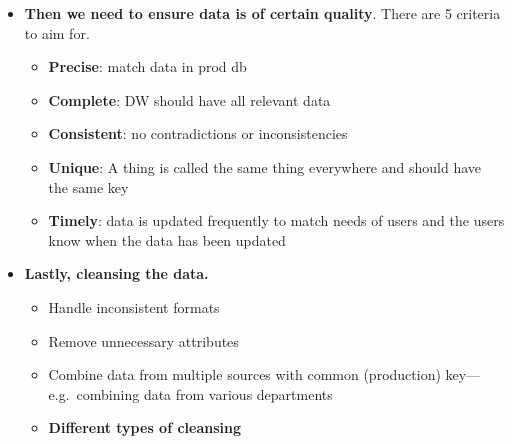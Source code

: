 \begin{multicols}{2}
\begin{itemize}
\begin{itemize}
\begin{itemize}
      \begin{itemize}
            \item
        E.g. date/time format conversions, so it is uniform.
      \end{itemize}
    \item
      \textbf{Normalization/denormalization}

      \begin{itemize}
            \item
        To desired format: star schema, snowflake schema, etc
      \end{itemize}
    \item
      \textbf{Building keys}

      \begin{itemize}
            \item
        Table matches production keys to surrogate DW keys

        \begin{itemize}
                \item
          Ensure production keys map to surrogate keys in DW
        \end{itemize}
      \item
        Correct handling of history (e.g.~with type 2 dimensions,
        especially for total reload)
      \end{itemize}
    \end{itemize}
  \item
    \textbf{Then we need to ensure data is of certain quality}. There
    are 5 criteria to aim for.

    \begin{itemize}
        \item
      \textbf{Precise}: match data in prod db
    \item
      \textbf{Complete}: DW should have all relevant data
    \item
      \textbf{Consistent}: no contradictions or inconsistencies
    \item
      \textbf{Unique}: A thing is called the same thing everywhere and
      should have the same key
    \item
      \textbf{Timely}: data is updated frequently to match needs of
      users and the users know when the data has been updated
    \end{itemize}
  \item
    \textbf{Lastly, cleansing the data.}

    \begin{itemize}
        \item
      Handle inconsistent formats
    \item
      Remove unnecessary attributes
    \item
      Combine data from multiple sources with common (production)
      key---e.g.~combining data from various departments
    \item
      \textbf{Different types of cleansing}


\end{itemize}
\end{itemize}
\end{itemize}
\end{multicols}
